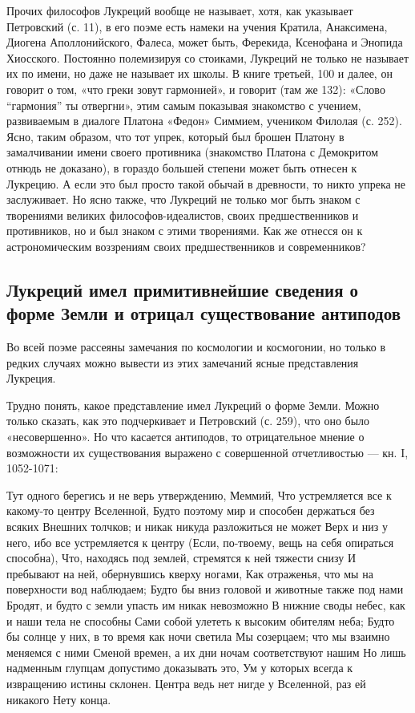 Прочих философов Лукреций вообще не называет, хотя, как указывает
Петровский (с. 11), в его поэме есть намеки на учения Кратила,
Анаксимена, Диогена Аполлонийского, Фалеса, может быть, Ферекида,
Ксенофана и Энопида Хиосского. Постоянно полемизируя со стоиками,
Лукреций не только не называет их по имени, но даже не называет их
школы. В книге третьей, 100 и далее, он говорит о том, «что греки
зовут гармонией», и говорит (там же 132): «Слово ``гармония'' ты
отвергни», этим самым показывая знакомство с учением, развиваемым в
диалоге Платона «Федон» Симмием, учеником Филолая (с. 252). Ясно,
таким образом, что тот упрек, который был брошен Платону в
замалчивании имени своего противника (знакомство Платона с Демокритом
отнюдь не доказано), в гораздо большей степени может быть отнесен к
Лукрецию. А если это был просто такой обычай в древности, то никто
упрека не заслуживает. Но ясно также, что Лукреций не только мог быть
знаком с творениями великих философов-идеалистов, своих
предшественников и противников, но и был знаком с этими творениями.
Как же отнесся он к астрономическим воззрениям своих предшественников
и современников?

\subsection{Лукреций имел примитивнейшие сведения о форме Земли и
отрицал существование антиподов}

Во всей поэме рассеяны замечания по космологии и космогонии, но
только в редких случаях можно вывести из этих замечаний ясные
представления Лукреция.

Трудно понять, какое представление имел Лукреций о форме Земли. Можно
только сказать, как это подчеркивает и Петровский (с. 259), что оно
было «несовершенно». Но что касается антиподов, то отрицательное
мнение о возможности их существования выражено с совершенной
отчетливостью --- кн. I, 1052-1071:

Тут одного берегись и не верь утверждению, Меммий, Что устремляется
все к какому-то центру Вселенной, Будто поэтому мир и способен
держаться без всяких Внешних толчков; и никак никуда разложиться не
может Верх и низ у него, ибо все устремляется к центру (Если,
по-твоему, вещь на себя опираться способна), Что, находясь под землей,
стремятся к ней тяжести снизу И пребывают на ней, обернувшись кверху
ногами, Как отраженья, что мы на поверхности вод наблюдаем; Будто бы
вниз головой и животные также под нами Бродят, и будто с земли упасть
им никак невозможно В нижние своды небес, как и наши тела не способны
Сами собой улететь к высоким обителям неба; Будто бы солнце у них, в
то время как ночи светила Мы созерцаем; что мы взаимно меняемся с ними
Сменой времен, а их дни ночам соответствуют нашим Но лишь надменным
глупцам допустимо доказывать это, Ум у которых всегда к извращению
истины склонен. Центра ведь нет нигде у Вселенной, раз ей никакого
Нету конца.

